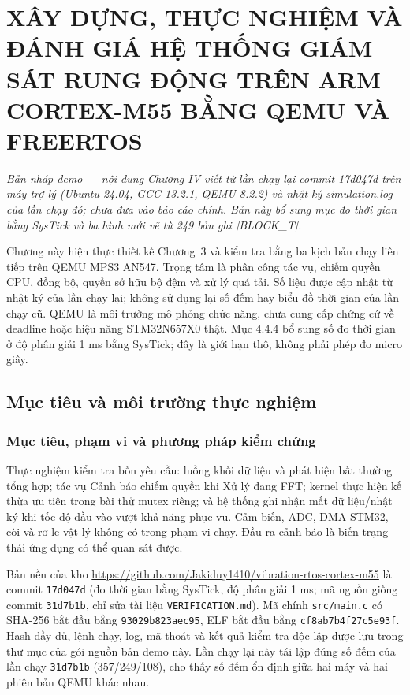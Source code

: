 \documentclass[12pt,a4paper,oneside]{report}
\begin{document}
\setcounter{chapter}{3}

\chapter{XÂY DỰNG, THỰC NGHIỆM VÀ ĐÁNH GIÁ HỆ THỐNG GIÁM SÁT RUNG ĐỘNG TRÊN ARM CORTEX-M55 BẰNG QEMU VÀ FREERTOS}
\label{chap:4}

\begin{center}
\small\itshape
Bản nháp demo — nội dung Chương IV viết từ lần chạy lại commit 17d047d trên máy trợ lý (Ubuntu 24.04, GCC 13.2.1, QEMU 8.2.2) và nhật ký simulation.log của lần chạy đó; chưa đưa vào báo cáo chính. Bản này bổ sung mục đo thời gian bằng SysTick và ba hình mới vẽ từ 249 bản ghi [BLOCK\_T].
\end{center}

Chương này hiện thực thiết kế Chương~3 và kiểm tra bằng ba kịch bản chạy liên tiếp trên QEMU MPS3 AN547. Trọng tâm là phân công tác vụ, chiếm quyền CPU, đồng bộ, quyền sở hữu bộ đệm và xử lý quá tải. Số liệu được cập nhật từ nhật ký của lần chạy lại; không sử dụng lại số đếm hay biểu đồ thời gian của lần chạy cũ. QEMU là môi trường mô phỏng chức năng, chưa cung cấp chứng cứ về deadline hoặc hiệu năng STM32N657X0 thật. Mục 4.4.4 bổ sung số đo thời gian ở độ phân giải 1 ms bằng SysTick; đây là giới hạn thô, không phải phép đo micro giây.

\section{Mục tiêu và môi trường thực nghiệm}
\subsection{Mục tiêu, phạm vi và phương pháp kiểm chứng}
Thực nghiệm kiểm tra bốn yêu cầu: luồng khối dữ liệu và phát hiện bất thường tổng hợp; tác vụ Cảnh báo chiếm quyền khi Xử lý đang FFT; kernel thực hiện kế thừa ưu tiên trong bài thử mutex riêng; và hệ thống ghi nhận mất dữ liệu/nhật ký khi tốc độ đầu vào vượt khả năng phục vụ. Cảm biến, ADC, DMA STM32, còi và rơ-le vật lý không có trong phạm vi chạy. Đầu ra cảnh báo là biến trạng thái ứng dụng có thể quan sát được.

Bản nền của kho \url{https://github.com/Jakiduy1410/vibration-rtos-cortex-m55} là commit \texttt{17d047d} (đo thời gian bằng SysTick, độ phân giải 1 ms; mã nguồn giống commit \texttt{31d7b1b}, chỉ sửa tài liệu \texttt{VERIFICATION.md}). Mã chính \texttt{src/main.c} có SHA-256 bắt đầu bằng \texttt{93029b823aec95}, ELF bắt đầu bằng \texttt{cf8ab7b4f27c5e93f}. Hash đầy đủ, lệnh chạy, log, mã thoát và kết quả kiểm tra độc lập được lưu trong thư mục  của gói nguồn bản demo này. Lần chạy lại này tái lập đúng số đếm của lần chạy \texttt{31d7b1b} (357/249/108), cho thấy số đếm ổn định giữa hai máy và hai phiên bản QEMU khác nhau.
\end{document}
